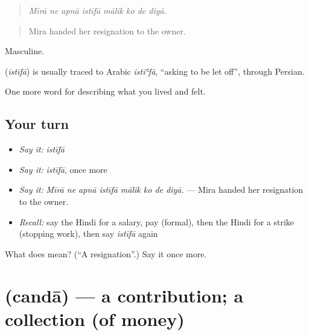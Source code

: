 \begin{quote}
       
\end{quote}

\begin{quote}
\emph{Mīrā ne apnā istīfā mālik ko de diyā.}
\end{quote}

\begin{quote}
Mira handed her resignation to the owner.
\end{quote}

Masculine.

\begin{cousinweb}
\textbf{} (\emph{istīfā}) is usually traced to Arabic \emph{istiʿfā}, \textquotedblleft{}asking to be let off\textquotedblright{}, through Persian.
\end{cousinweb}

\begin{grammarlens}[title={What you've built}]
One more word for describing what you lived and felt.
\end{grammarlens}

\subsection*{Your turn}
\begin{itemize}
\raggedright
  \item \emph{Say it:} \emph{istīfā}
  \item \emph{Say it:} \emph{istīfā}, once more
  \item \emph{Say it:} \emph{Mīrā ne apnā istīfā mālik ko de diyā.} — Mira handed her resignation to the owner.
  \item \emph{Recall:} say the Hindi for a salary, pay (formal), then the Hindi for a strike (stopping work), then say \emph{istīfā} again
\end{itemize}

\begin{tcolorbox}[breakable,colback=teal!4,colframe=teal!35!black,title={Before you move on}]
What does  mean? (\textquotedblleft{}A resignation\textquotedblright{}.) Say it once more.
\end{tcolorbox}
\section[\texorpdfstring{\hi{चंदा} (candā)}{चंदा (candā)}]{ (candā) — a contribution; a collection (of money)}

